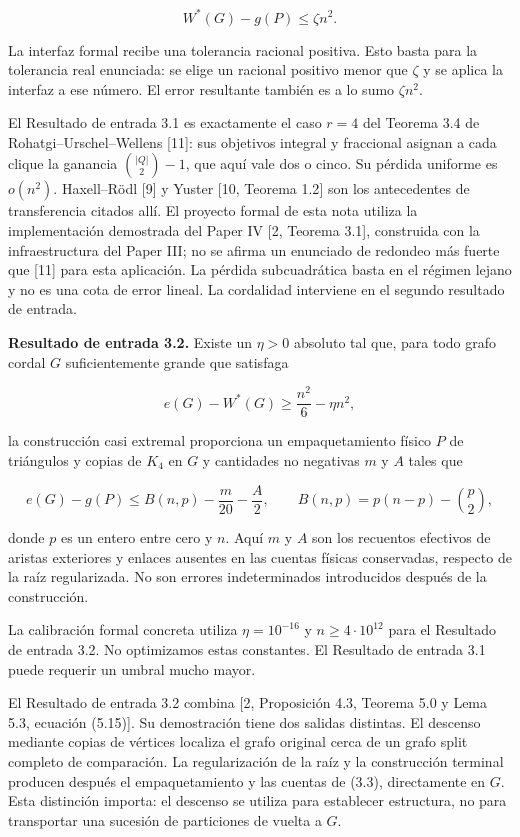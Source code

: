 \documentclass[spanish,11pt,a4paper]{article}
\begin{document}
\[
W^*(G)-g(P)\le\zeta n^2.
\tag{3.1}
\]

La interfaz formal recibe una tolerancia racional positiva. Esto basta
para la tolerancia real enunciada: se elige un racional positivo menor
que \(\zeta\) y se aplica la interfaz a ese número. El error resultante
también es a lo sumo \(\zeta n^2\).

El Resultado de entrada 3.1 es exactamente el caso \(r=4\) del Teorema
3.4 de Rohatgi--Urschel--Wellens {[}11{]}: sus objetivos integral y
fraccional asignan a cada clique la ganancia \(\binom{|Q|}{2}-1\), que
aquí vale dos o cinco. Su pérdida uniforme es \(o(n^2)\). Haxell--Rödl
{[}9{]} y Yuster {[}10, Teorema 1.2{]} son los antecedentes de
transferencia citados allí. El proyecto formal de esta nota utiliza la
implementación demostrada del Paper IV {[}2, Teorema 3.1{]}, construida
con la infraestructura del Paper III; no se afirma un enunciado de
redondeo más fuerte que {[}11{]} para esta aplicación. La pérdida
subcuadrática basta en el régimen lejano y no es una cota de error
lineal. La cordalidad interviene en el segundo resultado de entrada.

\textbf{Resultado de entrada 3.2.} Existe un \(\eta>0\) absoluto tal
que, para todo grafo cordal \(G\) suficientemente grande que satisfaga

\[
e(G)-W^*(G)\ge\frac{n^2}{6}-\eta n^2,
\tag{3.2}
\]

la construcción casi extremal proporciona un empaquetamiento físico
\(P\) de triángulos y copias de \(K_4\) en \(G\) y cantidades no
negativas \(m\) y \(A\) tales que

\[
e(G)-g(P)\le B(n,p)-\frac m{20}-\frac A2,
\qquad
B(n,p)=p(n-p)-\binom p2,
\tag{3.3}
\]

donde \(p\) es un entero entre cero y \(n\). Aquí \(m\) y \(A\) son los
recuentos efectivos de aristas exteriores y enlaces ausentes en las
cuentas físicas conservadas, respecto de la raíz regularizada. No son
errores indeterminados introducidos después de la construcción.

La calibración formal concreta utiliza \(\eta=10^{-16}\) y
\(n\ge4\cdot10^{12}\) para el Resultado de entrada 3.2. No optimizamos
estas constantes. El Resultado de entrada 3.1 puede requerir un umbral
mucho mayor.

El Resultado de entrada 3.2 combina {[}2, Proposición 4.3, Teorema 5.0 y
Lema 5.3, ecuación (5.15){]}. Su demostración tiene dos salidas
distintas. El descenso mediante copias de vértices localiza el grafo
original cerca de un grafo split completo de comparación. La
regularización de la raíz y la construcción terminal producen después el
empaquetamiento y las cuentas de (3.3), directamente en \(G\). Esta
distinción importa: el descenso se utiliza para establecer estructura,
no para transportar una sucesión de particiones de vuelta a \(G\).
\end{document}
